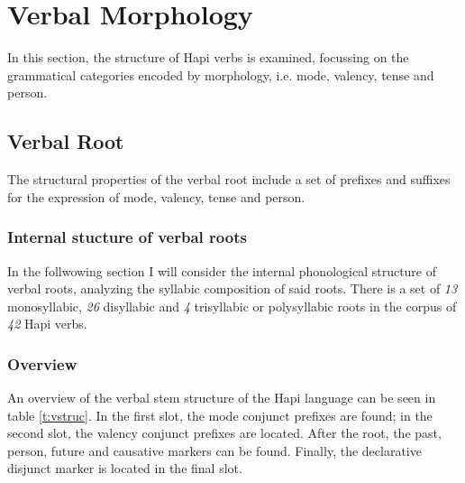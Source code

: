 \documentclass[a4paper, 12pt, oneside]{memoir}
\begin{document}
\section{Verbal Morphology}
In this section, the structure of Hapi verbs is examined, focussing on the grammatical categories encoded by morphology, i.e. mode, valency, tense and person.
\subsection{Verbal Root}\label{sverbalroot}
The structural properties of the verbal root include a set of prefixes and suffixes for the expression of mode, valency, tense and person. 
\subsubsection{Internal stucture of verbal roots}
In the follwowing section I will consider the internal phonological structure of verbal roots, analyzing the syllabic composition of said roots. 
There is a set of \textit{13} monosyllabic, \textit{26} disyllabic and \textit{4} trisyllabic or polysyllabic roots in the corpus of \textit{42} Hapi verbs.
\subsubsection{Overview}
An overview of the verbal stem structure of the Hapi language can be seen in table \ref{t:vstruc}. In the first slot, the mode conjunct prefixes are found; in the second slot, the valency conjunct prefixes are located. After the root, the past, person, future and causative markers can be found. Finally, the declarative disjunct marker is located in the final slot.
\begin{table}[p!]
    \centering
    \caption{Verbal Stem Structure}
    \label{t:vstruc}
\end{table}
\end{document}
